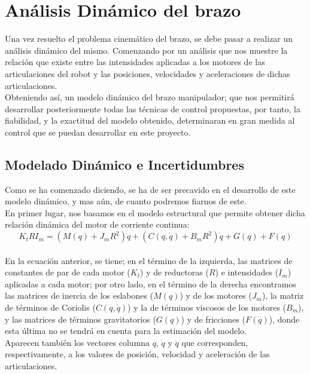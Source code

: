 \section{Análisis Dinámico del brazo}
Una vez resuelto el problema cinemático del brazo, se debe pasar a realizar un análisis dinámico del mismo. Comenzando por un análisis que nos muestre la relación que existe entre las intensidades aplicadas a los motores de las articulaciones del robot y las posiciones, velocidades y aceleraciones de dichas articulaciones.\\
Obteniendo así, un modelo dinámico del brazo manipulador; que nos permitirá desarrollar posteriormente todas las técnicas de control propuestas, por tanto, la fiabilidad, y la exactitud del modelo obtenido, determinaran en gran medida al control que se puedan desarrollar en este proyecto.


\subsection{Modelado Dinámico e Incertidumbres}
Como se ha comenzado diciendo, se ha de ser precavido en el desarrollo de este modelo dinámico, y mas aún, de cuanto podremos fiarnos de este.\\

En primer lugar, nos basamos en el modelo estructural que permite obtener dicha relación dinámica del motor de corriente continua:\\

	\begin{equation}
	K_tRI_m=(M(q)+J_mR^2)\ddot{q}+(C(q,\dot{q})+B_mR^2)\dot{q}+G(q)+F(\dot{q})
	\end{equation}\\
	
En la ecuación anterior, se tiene; en el término de la izquierda, las matrices de constantes de par de cada motor ($K_t$) y de reductoras ($R$) e intensidades ($I_m$) aplicadas a cada motor; por otro lado, en el término de la derecha encontramos las matrices de inercia de los eslabones ($M(q)$) y de los motores ($J_m$), la matriz de términos de Coriolis ($C(q,\dot{q})$) y la de términos viscosos de los motores ($B_m$), y las matrices de términos gravitatorios ($G(q)$) y de fricciones ($F(\dot{q})$), donde esta última no se tendrá en cuenta para la estimación del modelo.\\

Aparecen también los vectores columna $q$, $\dot{q}$ y $\ddot{q}$ que corresponden, respectivamente, a los valores de posición, velocidad y aceleración de las articulaciones.\\

